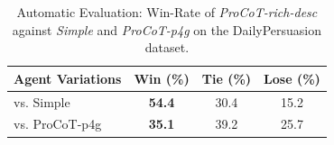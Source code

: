 \begin{table}[t]
    \footnotesize
    \centering
    \begin{tabular}{lccc}
        \toprule
        \textbf{Agent Variations} & \textbf{Win (\%)} & \textbf{Tie (\%)} & \textbf{Lose (\%)} \\
        \midrule
        vs. Simple & \textbf{54.4} & 30.4 & 15.2 \\
        vs. ProCoT-p4g & \textbf{35.1} & 39.2 & 25.7 \\
        \bottomrule
    \end{tabular}
    \caption{Automatic Evaluation: Win-Rate of \textit{ProCoT-rich-desc} against \textit{Simple} and \textit{ProCoT-p4g} on the DailyPersuasion dataset.} 
    \label{tab:result-daily-persuasion}
\end{table}